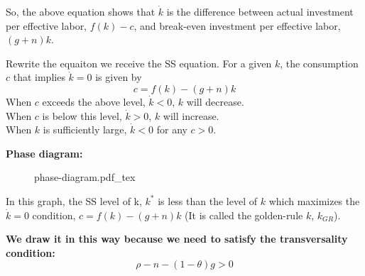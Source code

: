 \documentclass[12pt]{article}
\newcommand{\incfig}[1]{%
\def\svgwidth{\columnwidth}
{#1.pdf_tex}
}
\begin{document}
So, the above equation shows that $ \dot{k} $ is the difference between actual 
investment per effective labor, $ f(k) - c $, and break-even investment per effective
labor, $ (g + n)k $.

Rewrite the equaiton we receive the SS equation. For a given $ k $, the consumption
$ c $ that implies $ \dot{k} = 0 $ is given by
\begin{equation*}
c = f(k) - (g + n)k
\end{equation*}
When $ c $ exceeds the above level, $ \dot{k} < 0 $, $ k $ will decrease.\\
When $ c $ is below this level, $ \dot{k} > 0 $, $ k $ will increase.\\
When $ k $ is sufficiently large, $ \dot{k} < 0 $ for any $ c > 0 $.

\begin{figure}[H]
\end{figure}



\newpage
{\textbf {Phase diagram:}}


\begin{figure}[ht]
    \centering
    \incfig{phase-diagram}
    \label{fig:phase-diagram}
\end{figure}


In this graph, the SS level of k, $ k ^{*} $ is less than the level of $ k $
which maximizes the $ \dot{k} = 0 $ condition, $ c = f(k) - (g + n)k $ (It is called 
the golden-rule $ k $, $ k_{GR} $).

{\textbf {We draw it in this way because we need to satisfy the transversality 
condition:}}
\begin{equation*}
		\rho - n - (1 - \theta) g > 0
\end{equation*}
\end{document}
